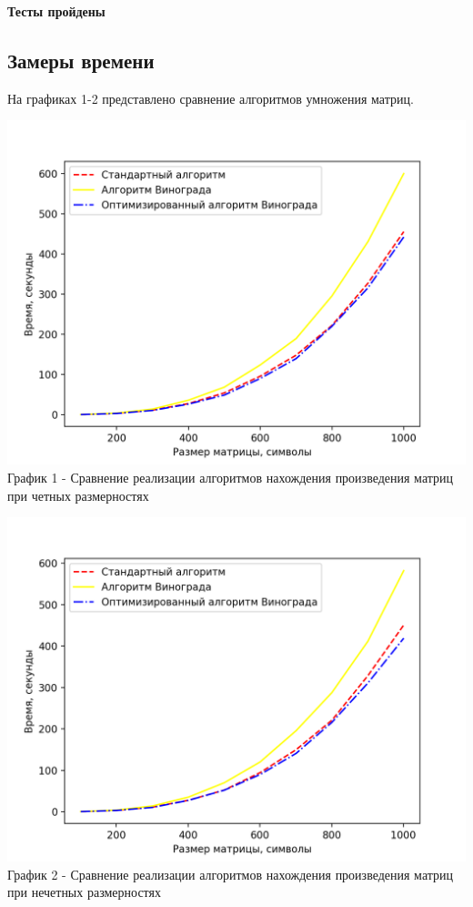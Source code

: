 \documentclass[a4paper,14pt]{article} %
\begin{document}
	
	\textbf{Тесты пройдены}

	\subsection{Замеры времени}
	\hfill
	
	На графиках 1-2 представлено сравнение алгоритмов умножения матриц. 
	\begin{center}
        		\includegraphics[scale = 1]{graph1} \\ График 1 - Сравнение реализации алгоритмов нахождения произведения матриц при четных размерностях
	\end{center}
	
	\begin{center}
        		\includegraphics[scale = 1]{graph2} \\ График 2 - Сравнение реализации алгоритмов нахождения произведения матриц при нечетных размерностях
	\end{center}
	
\end{document}
